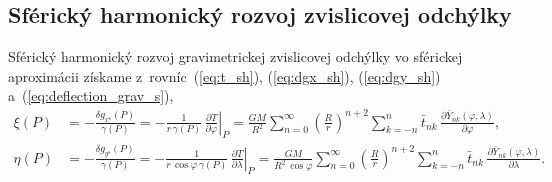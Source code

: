 \documentclass[a4paper,12pt]{book}
\begin{document}
\subsection{Sférický harmonický rozvoj zvislicovej odchýlky}

Sférický harmonický rozvoj gravimetrickej zvislicovej odchýlky vo sférickej 
aproximácii získame z~rovníc~(\ref{eq:t_sh}), (\ref{eq:dgx_sh}), 
(\ref{eq:dgy_sh}) a~(\ref{eq:deflection_grav_s}),
%
\begin{equation}
\label{eq:deflection_grav_s_sph}
\begin{split}
\xi(P) &= -\frac{\delta g_{x^\mathrm{s}}(P)}{\gamma(P)} = -\frac{1}{r \, 
\gamma(P)} \, \left.\frac{\partial T}{\partial \varphi}\right|_P 
= \frac{GM}{R^2} \sum_{n = 0}^\infty \left( \frac{R}{r} \right)^{n + 2} \sum_{k 
= -n}^{n} \bar{t}_{nk} \, \frac{\partial \bar{Y}_{nk}(\varphi, 
\lambda)}{\partial \varphi}{,}\\
%
\eta(P) &= -\frac{\delta g_{y^\mathrm{s}}(P)}{\gamma(P)} = -\left.\frac{1}{r \, 
\cos\varphi \,\gamma(P)} \, \frac{\partial T}{\partial \lambda}\right|_P 
= \frac{GM}{R^2 \, \cos\varphi} \sum_{n = 0}^\infty \left( \frac{R}{r} 
\right)^{n + 2} \sum_{k = -n}^{n}\bar{t}_{nk} \, \frac{\partial 
\bar{Y}_{nk}(\varphi, \lambda)}{\partial \lambda}{.}\\
\end{split}
\end{equation}
\end{document}
